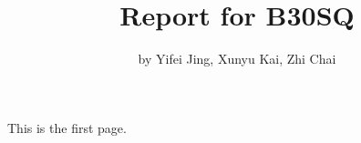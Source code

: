 \documentclass{report}
\begin{document}
    \title{Report for B30SQ}

    \author{by Yifei Jing, Xunyu Kai, Zhi Chai}
    This is the first page.
\end{document}
